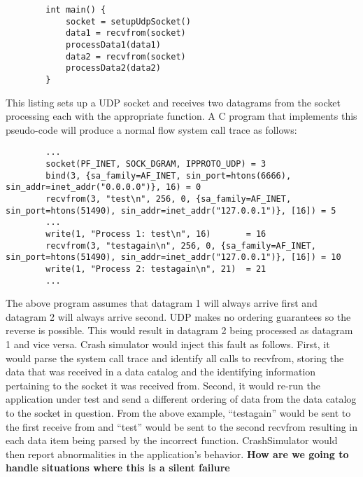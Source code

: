     \begin{verbatim}
        int main() {
            socket = setupUdpSocket()
            data1 = recvfrom(socket)
            processData1(data1)
            data2 = recvfrom(socket)
            processData2(data2)
        }
    \end{verbatim}

    This listing sets up a UDP socket and receives two datagrams from the socket processing each with the appropriate
    function. A C program that implements this pseudo-code will produce a normal flow system call trace as follows:

    \begin{verbatim}
        ...
        socket(PF_INET, SOCK_DGRAM, IPPROTO_UDP) = 3
        bind(3, {sa_family=AF_INET, sin_port=htons(6666), sin_addr=inet_addr("0.0.0.0")}, 16) = 0
        recvfrom(3, "test\n", 256, 0, {sa_family=AF_INET, sin_port=htons(51490), sin_addr=inet_addr("127.0.0.1")}, [16]) = 5
        ...
        write(1, "Process 1: test\n", 16)       = 16
        recvfrom(3, "testagain\n", 256, 0, {sa_family=AF_INET, sin_port=htons(51490), sin_addr=inet_addr("127.0.0.1")}, [16]) = 10
        write(1, "Process 2: testagain\n", 21)  = 21
        ...
    \end{verbatim}

    The above program assumes that datagram 1 will always arrive first and datagram 2 will always arrive second. UDP
    makes no ordering guarantees so the reverse is possible. This would result in datagram 2 being processed as datagram
    1 and vice versa. Crash simulator would inject this fault as follows. First, it would parse the system call trace
    and identify all calls to recvfrom, storing the data that was received in a data catalog and the identifying
    information pertaining to the socket it was received from. Second, it would re-run the application under test and
    send a different ordering of data from the data catalog to the socket in question. From the above example,
    ``testagain'' would be sent to the first receive from and ``test'' would be sent to the second recvfrom resulting in
    each data item being parsed by the incorrect function. CrashSimulator would then report abnormalities in the
    application's behavior. \textbf{How are we going to handle situations where this is a silent failure}

